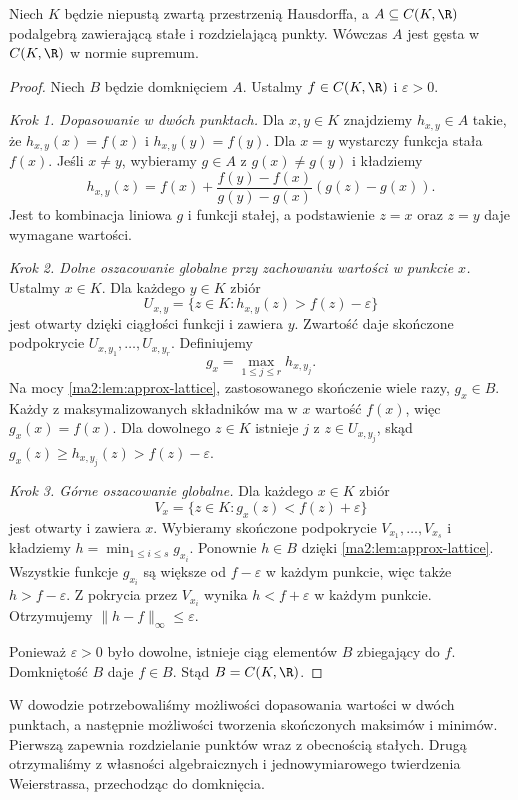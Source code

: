 \begin{twierdzenie}
\label{ma2:thm:approx-stone-weierstrass}
Niech $K$ będzie niepustą zwartą przestrzenią
Hausdorffa, a $A\subseteq C(K,\R)$ podalgebrą
zawierającą stałe i rozdzielającą punkty.
Wówczas $A$ jest gęsta w $C(K,\R)$
w normie supremum.
\end{twierdzenie}
\begin{proof}
Niech $B$ będzie domknięciem $A$.
Ustalmy $f\in C(K,\R)$ i $\varepsilon>0$.

\emph{Krok 1. Dopasowanie w dwóch punktach.}
Dla $x,y\in K$ znajdziemy $h_{x,y}\in A$
takie, że $h_{x,y}(x)=f(x)$ i
$h_{x,y}(y)=f(y)$.
Dla $x=y$ wystarczy funkcja stała $f(x)$.
Jeśli $x\ne y$, wybieramy $g\in A$
z $g(x)\ne g(y)$ i kładziemy
\[
 h_{x,y}(z)=f(x)+
 \frac{f(y)-f(x)}{g(y)-g(x)}(g(z)-g(x)).
\]
Jest to kombinacja liniowa $g$ i funkcji stałej,
a podstawienie $z=x$ oraz $z=y$ daje
wymagane wartości.

\emph{Krok 2. Dolne oszacowanie globalne
przy zachowaniu wartości w punkcie $x$.}
Ustalmy $x\in K$. Dla każdego $y\in K$
zbiór
\[
 U_{x,y}=\{z\in K:h_{x,y}(z)>f(z)-\varepsilon\}
\]
jest otwarty dzięki ciągłości funkcji
i zawiera $y$. Zwartość daje skończone
podpokrycie $U_{x,y_1},\ldots,U_{x,y_r}$.
Definiujemy
\[
 g_x=\max_{1\le j\le r}h_{x,y_j}.
\]
Na mocy \ref{ma2:lem:approx-lattice}, zastosowanego
skończenie wiele razy, $g_x\in B$.
Każdy z maksymalizowanych składników
ma w $x$ wartość $f(x)$, więc $g_x(x)=f(x)$.
Dla dowolnego $z\in K$ istnieje $j$ z
$z\in U_{x,y_j}$, skąd
$g_x(z)\ge h_{x,y_j}(z)>f(z)-\varepsilon$.

\emph{Krok 3. Górne oszacowanie globalne.}
Dla każdego $x\in K$ zbiór
\[
 V_x=\{z\in K:g_x(z)<f(z)+\varepsilon\}
\]
jest otwarty i zawiera $x$.
Wybieramy skończone podpokrycie
$V_{x_1},\ldots,V_{x_s}$ i kładziemy
$h=\min_{1\le i\le s}g_{x_i}$.
Ponownie $h\in B$ dzięki
\ref{ma2:lem:approx-lattice}.
Wszystkie funkcje $g_{x_i}$ są większe
od $f-\varepsilon$ w każdym punkcie,
więc także $h>f-\varepsilon$.
Z pokrycia przez $V_{x_i}$ wynika
$h<f+\varepsilon$ w każdym punkcie.
Otrzymujemy $\|h-f\|_\infty\le\varepsilon$.

Ponieważ $\varepsilon>0$ było dowolne,
istnieje ciąg elementów $B$ zbiegający do $f$.
Domkniętość $B$ daje $f\in B$.
Stąd $B=C(K,\R)$.
\end{proof}

W dowodzie potrzebowaliśmy możliwości dopasowania
wartości w dwóch punktach, a następnie możliwości
tworzenia skończonych maksimów i minimów.
Pierwszą zapewnia rozdzielanie punktów wraz
z obecnością stałych. Drugą otrzymaliśmy
z własności algebraicznych i jednowymiarowego
twierdzenia Weierstrassa, przechodząc do domknięcia.

